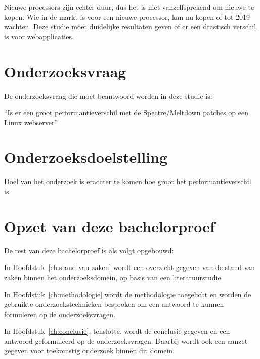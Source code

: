 Nieuwe processors zijn echter duur, dus het is niet vanzelfsprekend om nieuwe te kopen.
Wie in de markt is voor een nieuwe processor, kan nu kopen of tot 2019 wachten.
Deze studie moet duidelijke resultaten geven of er een drastisch verschil is voor webapplicaties.


\section{Onderzoeksvraag}
\label{sec:onderzoeksvraag}


De onderzoeksvraag die moet beantwoord worden in deze studie is: 

``Is er een groot performantieverschil met de Spectre/Meltdown patches op een Linux webserver''


\section{Onderzoeksdoelstelling}
\label{sec:onderzoeksdoelstelling}


Doel van het onderzoek is erachter te komen hoe groot het performantieverschil is. 

\section{Opzet van deze bachelorproef}
\label{sec:opzet-bachelorproef}


De rest van deze bachelorproef is als volgt opgebouwd:

In Hoofdstuk~\ref{ch:stand-van-zaken} wordt een overzicht gegeven van de stand van zaken binnen het onderzoeksdomein, op basis van een literatuurstudie.

In Hoofdstuk~\ref{ch:methodologie} wordt de methodologie toegelicht en worden de gebruikte onderzoekstechnieken besproken om een antwoord te kunnen formuleren op de onderzoeksvragen.


In Hoofdstuk~\ref{ch:conclusie}, tenslotte, wordt de conclusie gegeven en een antwoord geformuleerd op de onderzoeksvragen. Daarbij wordt ook een aanzet gegeven voor toekomstig onderzoek binnen dit domein.

